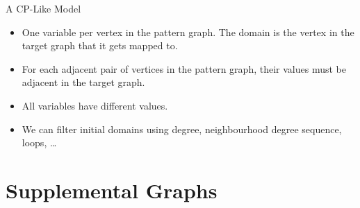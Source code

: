 \documentclass{beamer}
\begin{document}
\begin{frame}{A CP-Like Model}

    \begin{itemize}
        \item One variable per vertex in the pattern graph. The domain is the vertex in the target
            graph that it gets mapped to.

        \item For each adjacent pair of vertices in the pattern graph, their values must be adjacent
            in the target graph.

        \item All variables have different values.

        \item We can filter initial domains using degree, neighbourhood degree sequence, loops,
            \ldots
    \end{itemize}

\end{frame}

\section{Supplemental Graphs}

\frame{\sectionpage}
\end{document}
